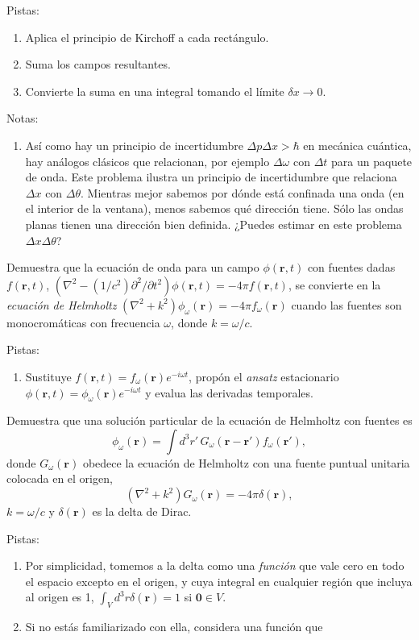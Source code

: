 \documentclass{exam}
\newenvironment{pistas}{\par\noindent Pistas:\begin{enumerate}} {\end{enumerate}}
\newenvironment{notas}{\par\noindent Notas:\begin{enumerate}} {\end{enumerate}}
\begin{document}
\begin{questions}
\begin{pistas}
  \item Aplica el principio de Kirchoff a cada rectángulo.
  \item Suma los campos resultantes.
  \item Convierte la suma en una integral tomando el límite $\delta
    x\to 0$.
  \end{pistas}
  \begin{notas}
  \item Así como hay un principio de incertidumbre $\Delta p\Delta
    x>\hbar$ en mecánica cuántica, hay análogos clásicos que
    relacionan, por ejemplo $\Delta\omega$ con $\Delta t$ para un
    paquete de onda. Este problema ilustra un principio de
    incertidumbre que relaciona $\Delta x$ con $\Delta
    \theta$. Mientras mejor sabemos por dónde está confinada una onda
    (en el interior de la ventana), menos sabemos qué dirección
    tiene. Sólo las ondas planas tienen una dirección bien
    definida. ¿Puedes estimar en este problema $\Delta x\Delta\theta$?
  \end{notas}
\question \label{m} Demuestra que la ecuación de onda para un campo
  $\phi(\bm r,t)$ con fuentes dadas $f(\bm r,t)$,
  $(\nabla^2-(1/c^2)\partial^2/\partial t^2)\phi(\bm r, t)=-4\pi f(\bm
  r,t)$, se convierte en la {\em ecuación de Helmholtz}
  $(\nabla^2+k^2)\phi_\omega(\bm r)=-4\pi f_\omega(\bm r)$ cuando las
  fuentes son monocromáticas con frecuencia $\omega$, donde $k=\omega/c$.
  \begin{pistas}
  \item Sustituye $f(\bm r,t)=f_\omega(\bm r) e^{-i\omega t}$, propón
    el {\em ansatz} estacionario $\phi(\bm r,t)=\phi_\omega(\bm r)
    e^{-i\omega t}$ y evalua las derivadas temporales.
  \end{pistas}
\question \label{n} Demuestra que una solución particular de la
  ecuación de Helmholtz con fuentes es
  $$
  \phi_\omega(\bm r)=\int d^3r'\, G_\omega(\bm r-\bm r') f_\omega(\bm r'),
  $$
  donde $G_\omega(\bm r)$ obedece la ecuación de Helmholtz con una
  fuente puntual unitaria colocada en el origen,
  $$
  (\nabla^2+k^2) G_\omega(\bm r)=-4\pi\delta(\bm r),
  $$
  $k=\omega/c$ y $\delta(\bm r)$ es la delta de Dirac.
  \begin{pistas}
  \item Por simplicidad, tomemos a la delta como una {\em función} que
    vale cero en todo el espacio excepto en el origen, y cuya integral
    en cualquier región que incluya al origen es 1,
    $\int_Vd^3r\delta(\bm r)=1$ si $\bm 0\in V$.
  \item Si no estás familiarizado con ella, considera una función que

\end{pistas}
\end{questions}
\end{document}
